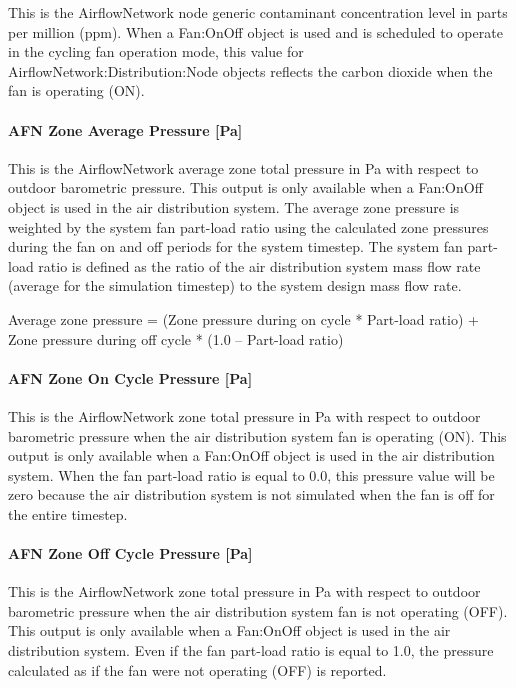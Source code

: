 This is the AirflowNetwork node generic contaminant concentration level in parts per million (ppm). When a Fan:OnOff object is used and is scheduled to operate in the cycling fan operation mode, this value for AirflowNetwork:Distribution:Node objects reflects the carbon dioxide when the fan is operating (ON).

\paragraph{AFN Zone Average Pressure {[}Pa{]}}\label{afn-zone-average-pressure-pa}

This is the AirflowNetwork average zone total pressure in Pa with respect to outdoor barometric pressure. This output is only available when a Fan:OnOff object is used in the air distribution system. The average zone pressure is weighted by the system fan part-load ratio using the calculated zone pressures during the fan on and off periods for the system timestep. The system fan part-load ratio is defined as the ratio of the air distribution system mass flow rate (average for the simulation timestep) to the system design mass flow rate.

Average zone pressure = (Zone pressure during on cycle * Part-load ratio) + Zone pressure during off cycle * (1.0 -- Part-load ratio)

\paragraph{AFN Zone On Cycle Pressure {[}Pa{]}}\label{afn-zone-on-cycle-pressure-pa}

This is the AirflowNetwork zone total pressure in Pa with respect to outdoor barometric pressure when the air distribution system fan is operating (ON). This output is only available when a Fan:OnOff object is used in the air distribution system. When the fan part-load ratio is equal to 0.0, this pressure value will be zero because the air distribution system is not simulated when the fan is off for the entire timestep.

\paragraph{AFN Zone Off Cycle Pressure {[}Pa{]}}\label{afn-zone-off-cycle-pressure-pa}

This is the AirflowNetwork zone total pressure in Pa with respect to outdoor barometric pressure when the air distribution system fan is not operating (OFF). This output is only available when a Fan:OnOff object is used in the air distribution system. Even if the fan part-load ratio is equal to 1.0, the pressure calculated as if the fan were not operating (OFF) is reported.

